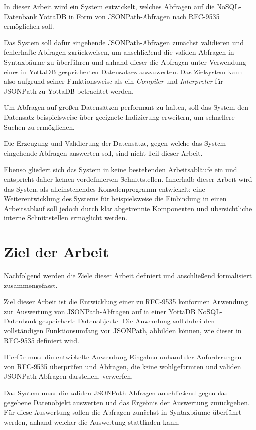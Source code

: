 \documentclass[oneside]{ausarbeitung}
\begin{document}
In dieser Arbeit wird ein System entwickelt, welches Abfragen auf die NoSQL-Datenbank YottaDB in Form von JSONPath-Abfragen nach RFC-9535 ermöglichen soll. 
	
Das System soll dafür eingehende JSONPath-Abfragen zunächst validieren und fehlerhafte Abfragen zurückweisen, um anschließend die validen Abfragen in Syntaxbäume zu überführen und anhand dieser die Abfragen unter Verwendung eines in YottaDB gespeicherten Datensatzes auszuwerten. Das Zielsystem kann also aufgrund seiner Funktionsweise als ein \textit{Compiler} und \textit{Interpreter} für JSONPath zu YottaDB betrachtet werden.
	
Um Abfragen auf großen Datensätzen performant zu halten, soll das System den Datensatz beispielsweise über geeignete Indizierung erweitern, um schnellere Suchen zu ermöglichen.
	
Die Erzeugung und Validierung der Datensätze, gegen welche das System eingehende Abfragen auswerten soll, sind nicht Teil dieser Arbeit. 
	
Ebenso gliedert sich das System in keine bestehenden Arbeitsabläufe ein und entspricht daher keinen vordefinierten Schnittstellen. Innerhalb dieser Arbeit wird das System als alleinstehendes Konsolenprogramm entwickelt; eine Weiterentwicklung des Systems für beispielsweise die Einbindung in einen Arbeitsablauf soll jedoch durch klar abgetrennte Komponenten und übersichtliche interne Schnittstellen ermöglicht werden.

\section{Ziel der Arbeit}
\label{sec:ziel}

Nachfolgend werden die Ziele dieser Arbeit definiert und anschließend formalisiert zusammengefasst.
	
Ziel dieser Arbeit ist die Entwicklung einer zu RFC-9535 konformen Anwendung zur Auswertung von JSONPath-Abfragen auf in einer YottaDB NoSQL-Datenbank gespeicherte Datenobjekte. Die Anwendung soll dabei den vollständigen Funktionsumfang von JSONPath, abbilden können, wie dieser in RFC-9535 definiert wird.
	
Hierfür muss die entwickelte Anwendung Eingaben anhand der Anforderungen von RFC-9535 überprüfen und Abfragen, die keine wohlgeformten und validen JSONPath-Abfragen darstellen, verwerfen. 
	
Das System muss die validen JSONPath-Abfragen anschließend gegen das gegebene Datenobjekt auswerten und das Ergebnis der Auswertung zurückgeben. Für diese Auswertung sollen die Abfragen zunächst in Syntaxbäume überführt werden, anhand welcher die Auswertung stattfinden kann.
	
\end{document}
